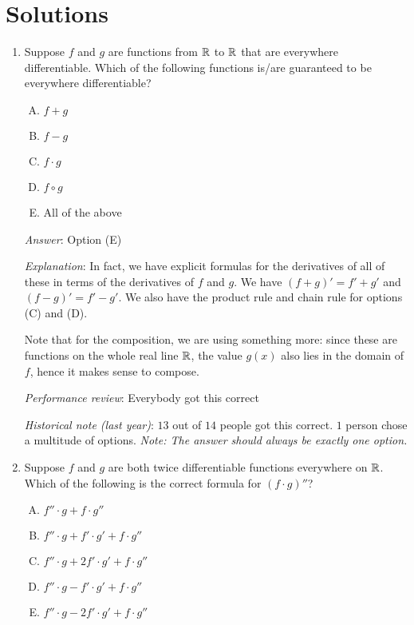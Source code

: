 \documentclass[10pt]{amsart}
\begin{document}
\section{Solutions}
\begin{enumerate}

\item Suppose $f$ and $g$ are functions from $\mathbb{R}$ to $\mathbb{R}$ that are
  everywhere differentiable. Which of the following functions is/are
  guaranteed to be everywhere differentiable?

  \begin{enumerate}[(A)]

  \item $f + g$
  \item $f - g$
  \item $f \cdot g$
  \item $f \circ g$
  \item All of the above
  \end{enumerate}

  {\em Answer}: Option (E)

  {\em Explanation}: In fact, we have explicit formulas for the
  derivatives of all of these in terms of the derivatives of $f$ and
  $g$. We have $(f + g)' = f' + g'$ and $(f - g)' = f' - g'$. We also
  have the product rule and chain rule for options (C) and (D).

  Note that for the composition, we are using something more: since
  these are functions on the whole real line $\mathbb{R}$, the value $g(x)$
  also lies in the domain of $f$, hence it makes sense to compose.

  {\em Performance review}: Everybody got this correct

  {\em Historical note (last year)}: $13$ out of $14$ people got this
  correct. $1$ person chose a multitude of options. {\em Note: The
  answer should always be exactly one option.}

\item Suppose $f$ and $g$ are both twice differentiable functions
  everywhere on $\mathbb{R}$. Which of the following is the correct formula
  for $(f \cdot g)''$?

  \begin{enumerate}[(A)]
  \item $f'' \cdot g + f \cdot g''$
  \item $f'' \cdot g + f' \cdot g' + f \cdot g''$
  \item $f'' \cdot g + 2f' \cdot g' + f \cdot g''$
  \item $f'' \cdot g - f' \cdot g' + f \cdot g''$
  \item $f'' \cdot g - 2f' \cdot g' + f \cdot g''$
  \end{enumerate}


\end{enumerate}
\end{document}
